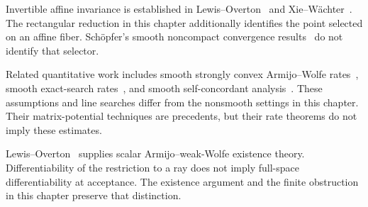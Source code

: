 Invertible affine invariance is established in Lewis--Overton~\cite[Section~2]{LO} and Xie--W\"achter~\cite[Theorem~II.1]{XW}. The rectangular reduction in this chapter additionally identifies the point selected on an affine fiber. Sch\"opfer's smooth noncompact convergence results~\cite[Theorems 3.4 and 3.7]{S16} do not identify that selector.

Related quantitative work includes smooth strongly convex Armijo--Wolfe rates~\cite{FND_JJM24AW}, smooth exact-search rates~\cite{FND_JJM26EX}, and smooth self-concordant analysis~\cite{FND_JM25}. These assumptions and line searches differ from the nonsmooth settings in this chapter. Their matrix-potential techniques are precedents, but their rate theorems do not imply these estimates.

Lewis--Overton~\cite[Theorem~4.5 and Proposition~4.11]{LO} supplies scalar Armijo--weak-Wolfe existence theory. Differentiability of the restriction to a ray does not imply full-space differentiability at acceptance. The existence argument and the finite obstruction in this chapter preserve that distinction.
